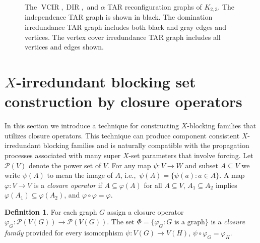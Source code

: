 \documentclass{article}
\numberwithin{figure}{section}
\numberwithin{table}{section}
\numberwithin{equation}{section}
\theoremstyle{definition}
\theoremstyle{definition}
\newtheorem{defn}[thm]{Definition}
\theoremstyle{definition}
\DeclareMathOperator{\DIR}{DIR}
\DeclareMathOperator{\VCIR}{VCIR}
\begin{document}
\begin{figure}[!h]
{
}

\caption{\label{f:K23-VCIR-DIR-TAR}  The $\VCIR, \DIR,$ and $\alpha$ TAR reconfiguration graphs of $K_{2,3}$.  The independence TAR graph is shown in black. The domination irredundance  TAR graph includes both black and gray edges and vertices.  The vertex cover irredundance TAR graph includes all vertices and edges shown.} 
\end{figure}





\section{$X$-irredundant blocking set construction by closure operators}\label{ss:block2}




In this section we introduce a technique for constructing $X$-blocking families that utilizes closure operators.  This technique  can produce component consistent $X$-irredundant blocking families and is  naturally compatible with the propagation processes associated with many super $X$-set parameters  that involve forcing. Let $\mathcal{P}(V)$ denote the power set of $V$.  For any map $\psi:V \to W$ and subset $A\subseteq V$ we write $\psi(A)$ to mean the image of $A$, i.e.,\ $\psi(A) = \{\psi(a) : a\in A\}$.  A  map $\varphi:V \to V$ is a \emph{closure operator} if $A\subseteq \varphi(A)$ for all $A\subseteq V$, $A_1\subseteq A_2$ implies $\varphi(A_1) \subseteq \varphi(A_2)$, and $\varphi \circ \varphi = \varphi$. 

\begin{defn}  
For each graph $G$ assign a  closure operator $\varphi_{G} : \mathcal{P}(V(G)) \to \mathcal{P}(V(G))$. The set $\Phi = \{\varphi_{G} : G \text{ is a graph}\}$ is a \emph{closure family} provided for every isomorphism $\psi: V(G)\to V(H)$, 
$\psi\circ \varphi_{G} = \varphi_{H}$.
\end{defn}
\end{document}
